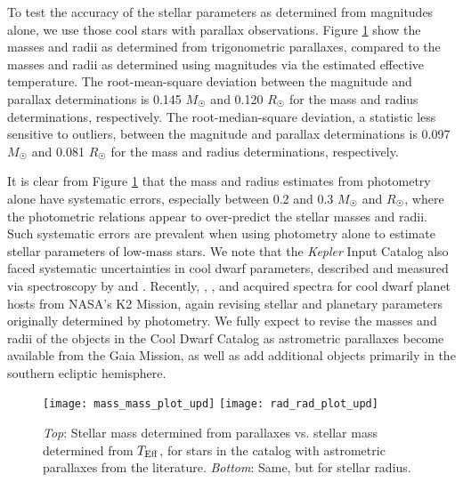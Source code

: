 \documentclass[twocolumn]{aastex62}
\begin{document}
To test the accuracy of the stellar parameters as determined from magnitudes alone, we use those cool stars with parallax observations.  Figure \ref{mass_radius} show the masses and radii as determined from trigonometric parallaxes, compared to the masses and radii as determined using magnitudes via the estimated effective temperature.  The root-mean-square deviation between the magnitude and parallax determinations is 0.145 $M_\Sun$ and 0.120 $R_\Sun$ for the mass and radius determinations, respectively.  The root-median-square deviation, a statistic less sensitive to outliers, between the magnitude and parallax determinations is 0.097 $M_\Sun$ and 0.081 $R_\Sun$ for the mass and radius determinations, respectively.  

It is clear from Figure \ref{mass_radius} that the mass and radius estimates from photometry alone have systematic errors, especially between 0.2 and 0.3 $M_\Sun$ and $R_\Sun$, where the photometric relations appear to over-predict the stellar masses and radii.  Such systematic errors are prevalent when using photometry alone to estimate stellar parameters of low-mass stars.  We note that the {\it Kepler} Input Catalog also faced systematic uncertainties in cool dwarf parameters, described \citep[][]{Brown2011} and measured via spectroscopy by \citet[][]{Muirhead2012a} and \citet[][]{Muirhead2014}.  Recently, \citet[][]{Dressing2017a}, \citet[][]{Dressing2017b}, \citet[][]{Martinez2017} and \citet[][]{Hirano2017} acquired spectra for cool dwarf planet hosts from NASA's K2 Mission, again revising stellar and planetary parameters originally determined by photometry.   We fully expect to revise the masses and radii of the objects in the Cool Dwarf Catalog as astrometric parallaxes become available from the Gaia Mission, as well as add additional objects primarily in the southern ecliptic hemisphere.

\begin{figure}
    \centering
    \texttt{[image: mass\_mass\_plot\_upd]}
    \texttt{[image: rad\_rad\_plot\_upd]}
    \caption{{\it Top}: Stellar mass determined from parallaxes vs. stellar mass determined from $T_{\rm Eff}$, for stars in the catalog with astrometric parallaxes from the literature.  {\it Bottom}: Same, but for stellar radius.\label{mass_radius}}
\end{figure}
\end{document}
